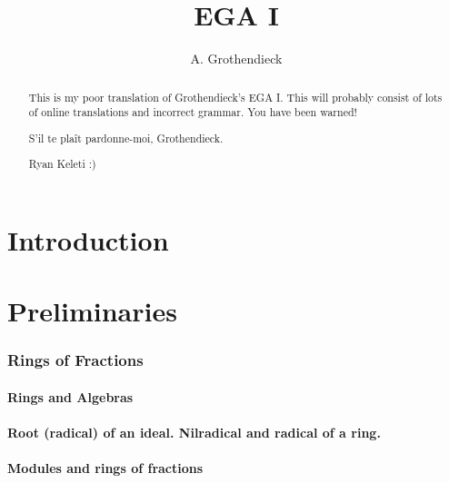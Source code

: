 \documentclass[10pt,oneside]{amsart}
\title{EGA I}
\author{A. Grothendieck}
\begin{document}
\renewcommand{\abstractname}{What this is}
\begin{abstract}
    This is my poor translation of Grothendieck's EGA I. This
    will probably consist of lots of online translations and incorrect grammar.
    You have been warned!

    S'il te pla\^it pardonne-moi, Grothendieck.

    Ryan Keleti :)
\end{abstract}

\maketitle

\noindent\hspace{0.15\linewidth}
\begin{minipage}{0.7\linewidth}
    \tableofcontents{}
\end{minipage}


\clearpage


\part*{Introduction}



\clearpage


\setcounter{part}{-1}

\part{Preliminaries}

    \section{Rings of Fractions}

        \subsection{Rings and Algebras}
        

        \subsection{Root (radical) of an ideal. Nilradical and radical of a ring.}
        

        \subsection{Modules and rings of fractions}
        
\end{document}
